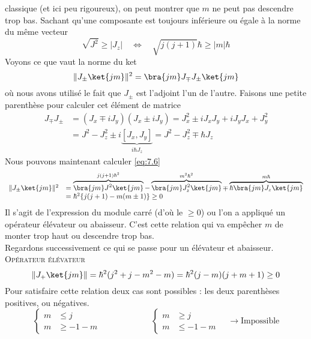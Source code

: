 classique (et ici peu rigoureux), on peut montrer que $m$ ne peut pas descendre 
trop bas. Sachant qu'une composante est toujours inférieure ou égale à la norme du 
même vecteur
\begin{equation}
\sqrt{J^2} \geq |J_z|\quad\Leftrightarrow\quad \sqrt{j(j+1)}\hbar \geq |m|\hbar
\end{equation}
Voyons ce que vaut la norme du ket
\begin{equation}
\|J_\pm\ket{jm}\|^2 = \bra{jm}J_\mp J_\pm\ket{jm}
\label{eq:7.6}
\end{equation}
où nous avons utilisé le fait que $J_\pm$ est l'adjoint l'un de l'autre. Faisons 
une petite parenthèse pour calculer cet élément de matrice
\begin{equation}
\begin{array}{ll}
J_\mp J_\pm &= (J_x\mp iJ_y)(J_x\pm iJ_y) = J_x^2\pm iJ_xJ_y+iJ_yJ_x+J_y^2\\
&=J^2-J_z^2 \pm i\underbrace{[J_x,J_y]}_{i\hbar J_z} = J^2-J_z^2 \mp \hbar J_z
\end{array}
\end{equation}
Nous pouvons maintenant calculer \eqref{eq:7.6}
\begin{equation}
\begin{array}{ll}
\|J_\pm\ket{jm}\|^2 &=  \overbrace{\bra{jm}J^2\ket{jm}}^{j(j+1)\hbar^2} - \overbrace{\bra{jm}J_z^2\ket{jm}}^{
m^2\hbar^2}\mp\overbrace{\hbar \bra{jm}J_z\ket{jm}}^{m\hbar}\\
&= \hbar^2\{j(j+1)-m(m\pm 1)\} \geq 0
\end{array}
\end{equation}
Il s'agit de l'expression du module carré (d'où le $\geq 0$) ou l'on a appliqué un opérateur élévateur 
ou abaisseur. C'est cette relation qui va empêcher $m$ de monter trop haut ou descendre trop bas.\\

Regardons successivement ce qui se passe pour un élévateur et abaisseur.\\
	\textsc{Opérateur élévateur}
	\begin{equation}
	\|J_+\ket{jm}\| = \hbar^2(j^2+j-m^2-m) = \hbar^2(j-m)(j+m+1)\geq 0
	\end{equation}
	Pour satisfaire cette relation deux cas sont possibles : les deux parenthèses positives, ou négatives.
	\begin{equation}
	\left\{\begin{array}{ll}
	m &\leq j\\
	m &\geq -1-m
	\end{array}\right.\qquad\qquad\qquad	\left\{\begin{array}{ll}
	m &\geq j\\
	m &\leq -1-m
	\end{array}\right.\quad\rightarrow \text{Impossible}
	\end{equation}
	
